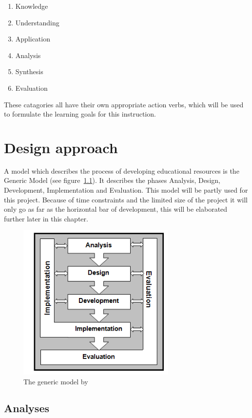 \documentclass[12pt]{report} %
\begin{document}
\begin{enumerate}
\item Knowledge
\item Understanding
\item Application
\item Analysis
\item Synthesis
\item Evaluation
\end{enumerate}

These catagories all have their own appropriate action verbs, which will be used to formulate the learning goals for this instruction.

\chapter{Design approach}

A model which describes the process of developing educational resources is the Generic Model \cite{genericmodel} (see figure~\ref{fig:genericmodel}). It describes the phases Analysis, Design, Development, Implementation and Evaluation. This model will be partly used for this project. Because of time constraints and the limited size of the project it will only go as far as the horizontal bar of development, this will be elaborated further later in this chapter.

\begin{figure}[h]
\centering
\includegraphics[width=0.7\textwidth]{genericmodel}
\caption{\footnotesize The generic model by \protect{}\label{fig:genericmodel}}
\end{figure}

\section{Analyses}
\end{document}
